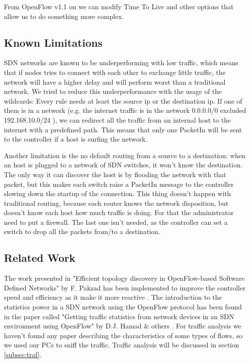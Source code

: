 \documentclass[article,10pt]{IEEEtran}
\begin{document}
From OpenFlow v1.1 on we can modify Time To Live and other options that allow us to do something more complex.

\subsection{Known Limitations}
SDN networks are known to be underperforming with low traffic, which means that if nodes tries to connect with each other
to exchange little traffic, the network will have a higher delay and will perform worst than a
traditional network. We tried to reduce this underperformance with the usage of the wildcards:
Every rule needs at least the source ip or the destination ip. If one of them is in a network
(e.g. the internet traffic is in the network 0.0.0.0/0 excluded 192.168.10.0/24 ),
we can redirect all the traffic from an internal host to the internet with a predefined
path. This means that only one PacketIn will be sent to the controller if a host is surfing the network.

Another limitation is the no default routing from a source to a destination: when an host
is plugged to a network of SDN switches, it won't know the destination. The only way it can
discover the host is by flooding the network with that packet, but this makes each switch raise a PacketIn message to the controller
slowing down the startup of the connection. This thing doesn't happen with traditional routing, because each router knows
the network disposition, but doesn't know each host how much traffic is doing. For that the administrator need to put a firewall.
The last one isn't needed, as the controller can set a switch to drop all the packets from/to a destination.


\subsection{Related Work}
  The work presented in
"Efficient topology discovery in OpenFlow-based Software Defined Networks" by F. Pakzad 
has been implemented to improve the controller speed and efficiency as it make it more reactive \cite{farzaneh}.
\newline The introduction to the statistics power in a SDN network using the OpenFlow protocol has been found
in the paper called "Getting traffic statistics from network devices in an SDN environment using OpenFlow" by D.J. Hamad \& others \cite{stat}.
\newline For traffic analysis we haven't found any paper describing the characteristics of
some types of flows, so we used our PCs to sniff the traffic. \newline 
Traffic analysis will be discussed in section \ref{subsec:traf}.
\end{document}
